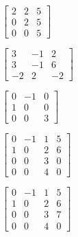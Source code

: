 \begin{oppgave}
\begin{punkt}
$
\begin{bmatrix}
2 & 2 & 5\\
0 & 2 & 5\\
0 & 0 & 5
\end{bmatrix}
$ 
\end{punkt}
%
%
%
%
%
%
%
%
%
%
\begin{punkt}
$\begin{bmatrix}
3 & -1 & 2\\
3 & -1 & 6\\
-2 & 2 & -2
\end{bmatrix}$
\end{punkt}

\begin{punkt}
$\begin{bmatrix}
0 & -1 & 0\\
1 & 0 & 0\\
0 & 0 & 3
\end{bmatrix}$
\end{punkt}



\begin{punkt}
$\begin{bmatrix}
0 & -1 & 1& 5\\
1 & 0 & 2& 6\\
0 & 0 & 3 & 0\\
0 & 0 & 4 & 0
\end{bmatrix}$
\end{punkt}


\begin{punkt}
$\begin{bmatrix}
0 & -1 & 1& 5\\
1 & 0 & 2& 6\\
0 & 0 & 3 & 7\\
0 & 0 & 4 & 0
\end{bmatrix}$
\end{punkt}

\end{oppgave}

